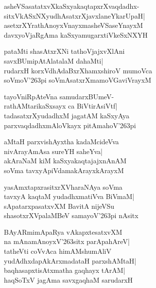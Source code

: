 \documentclass[twoside,12pt,openright]{book}
\def\S{\char'263}
\newcounter{shloka}[chapter]
\begin{document}
\begin{shloka}%
asheVSasatatxvXkaSxyakaqtapxrXvaqdadhx-\\
sitxVkASxNXyudhAsatxrXjavxlaneYkarUpaH|\\
asetxrXYrathAnoyxVnayxmasheVSaseYnayxM\\
davxyoVjaRgAma kaSxyamugarxtiVkeSxNXYH
\end{shloka}

\begin{shloka}%
 pataMti shasAtxrXNi tathoVjajxvXlAni\\
savxBUmipAtAlatalaM dahaMti|\\
rudarxH korxVdhAdaBxrXhamxshiroV mumoVca\\
soVmoV\S pi soVmAsatxrXmamoVGaviVrayxM 
\end{shloka}

\begin{shloka}%
tayoVniRpAteVna samudarxBUmeV-\\
rathAMtarikaSxsayx ca BiVtirAsiVtf|\\
tadasatxrXyudadhxM jagatAM kaSxyAya\\
parxvaqdadhxmAloVkayx pitAmahoV\S pi
\end{shloka}

\begin{shloka}%
aMtaH parxvishAyxtha kadaMcideVva\\
nivArayAmAsa sureYH saheYva|\\
akAraNaM kiM kaSxyakaqtajajxnAnAM\\
soVma tavxyApiVdamakArayxkArayxM
\end{shloka}

\begin{shloka}%
yasAmxtapxrasitxrXVharaNAya soVma\\
tavxyA kaqtaM yudadhxmatiVva BiVmaM|\\
sApatarxpasatxvXM BavitA nijeVSu\\
shasotxrXVpalaMBeV samayoV\S pi nAsitx
\end{shloka}

\begin{shloka}%
BAyARmimApaRya vAkapxtesatxvXM\\
na mAnamAnoyxV\S sitx parApahAreV|\\
tatheVti coVvAca himAMshumAliV\\
yudAdhxdapAkArxmadataH parxshAMtaH|\\
baqhasapxtisAtxmatha gaqhayx tArAM|\\
haqSoTxV jagAma savxgaqhaM sarudarxH
\end{shloka}
\end{document}
